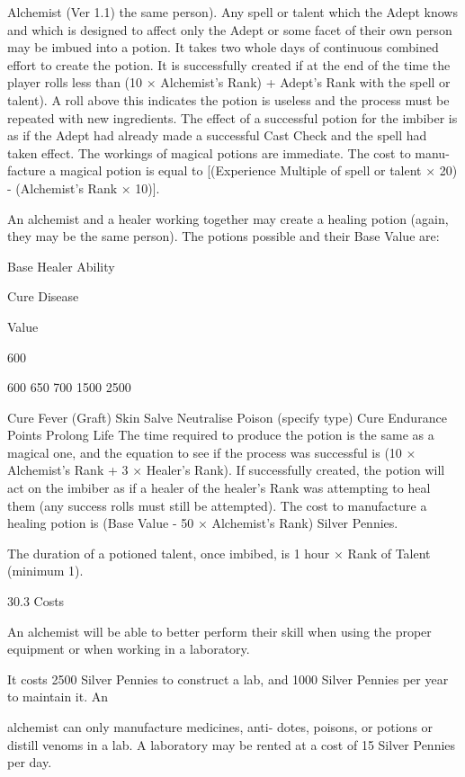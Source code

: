 \begin{Chapter}{Alchemist (Ver 1.1)}
the  same  person).  Any  spell  or  talent  which  the 
Adept knows and which is designed to affect only 
the  Adept  or  some  facet  of  their  own  person  may 
be imbued into a potion. It takes two whole days of 
continuous combined effort to create the potion. It 
is successfully created if at the end of the time the 
player  rolls  less  than  (10  ×  Alchemist’s  Rank)  + 
Adept’s Rank with the spell or talent). A roll above 
this  indicates  the potion  is  useless and  the  process 
must be  repeated  with  new  ingredients.  The  effect 
of  a  successful  potion  for  the  imbiber  is  as  if  the 
Adept  had  already  made  a  successful  Cast  Check 
and  the  spell  had  taken  effect.  The  workings  of 
magical  potions  are  immediate.  The cost to  manu-
facture  a  magical  potion  is  equal  to  [(Experience 
Multiple  of  spell  or  talent  ×  20)  -  (Alchemist’s 
Rank × 10)]. 

An  alchemist  and  a  healer  working  together  may 
create  a  healing  potion  (again,  they  may  be  the 
same  person).  The potions possible  and  their Base 
Value are: 

Base Healer Ability 

Cure Disease  

Value  

600 

600 
650 
700 
1500 
2500 

Cure Fever 
(Graft) Skin Salve 
Neutralise Poison (specify type) 
Cure Endurance Points  
Prolong Life 
The time required to produce the potion is the same 
as  a  magical  one,  and  the  equation  to  see  if  the 
process  was  successful  is  (10  ×  Alchemist’s  Rank 
+  3  ×  Healer’s  Rank).  If  successfully  created,  the 
potion will act on the imbiber as if a healer  of the 
healer’s  Rank  was  attempting  to  heal  them  (any 
success  rolls  must  still  be  attempted).  The  cost  to 
manufacture a healing potion is (Base Value - 50 × 
Alchemist’s Rank) Silver Pennies. 

The duration of a potioned talent, once imbibed, is 
1 hour × Rank of Talent (minimum 1). 

30.3 Costs 

An alchemist will be able to better perform their 
skill when using the proper equipment or when 
working in a laboratory. 

It costs 2500 Silver Pennies to construct a lab, and 
1000  Silver  Pennies  per  year  to  maintain  it.  An 

alchemist  can  only  manufacture  medicines,  anti-
dotes, poisons, or potions or distill venoms in a lab. 
A  laboratory  may  be  rented  at  a  cost  of  15  Silver 
Pennies per day. 


\end{Chapter}
